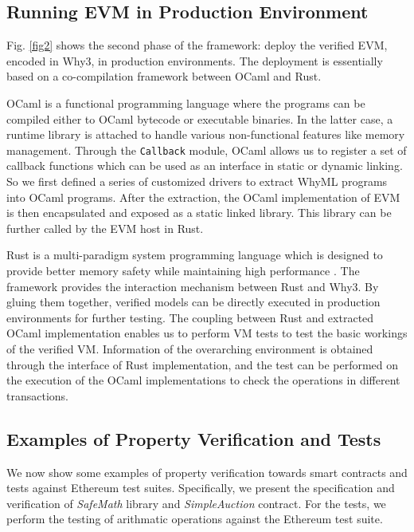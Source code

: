 \documentclass[runningheads]{llncs}
\begin{document}
\subsection{Running EVM in Production Environment}
Fig. \ref{fig2} shows the second phase of the framework: deploy the verified EVM, encoded in Why3, in production environments. The deployment is essentially based on a co-compilation framework between OCaml and Rust.

OCaml is a functional programming language where the programs can be compiled either to OCaml bytecode or executable binaries. In the latter case, a runtime library is attached to handle various non-functional features like memory management. Through the \texttt{Callback} module, OCaml allows us to register a set of callback functions which can be used as an interface in static or dynamic linking. 
So we first defined a series of customized drivers to extract WhyML programs into OCaml programs. After the extraction, the OCaml implementation of EVM is then encapsulated and exposed as a static linked library. This library can be further called by the EVM host in Rust.

Rust is a multi-paradigm system programming language which is designed to provide better memory safety while maintaining high performance \cite{LBHN16}.
The framework provides the interaction mechanism between Rust and Why3. By gluing them together, verified models can be directly executed in production environments for further testing. The coupling between Rust and extracted OCaml implementation enables us to perform VM tests to test the basic workings of the verified VM. Information of the overarching environment is obtained through the interface of Rust implementation, and the test can be performed on the execution of the OCaml implementations to check the operations in different transactions.    

\subsection{Examples of Property Verification and Tests}

We now show some examples of property verification towards smart contracts and tests against Ethereum 
test suites. Specifically, we present the specification and verification of \emph{SafeMath} library and \emph{SimpleAuction} contract.
For the tests, we perform the testing of arithmatic operations against the Ethereum test suite.
\end{document}
